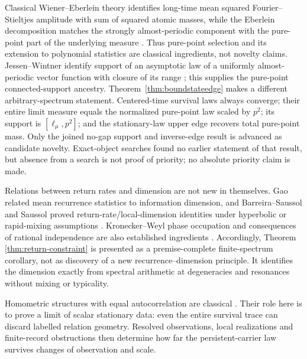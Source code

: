 Classical Wiener--Eberlein theory identifies long-time mean squared
Fourier--Stieltjes amplitude with sum of squared atomic masses, while the
Eberlein decomposition matches the strongly almost-periodic component with
the pure-point part of the underlying measure
\cite{Eberlein1955,StrungaruTerauds2016}.  Thus pure-point selection and its
extension to polynomial statistics are classical ingredients, not novelty
claims.  Jessen--Wintner identify support of an asymptotic law of
a uniformly almost-periodic vector function with closure of its range
\cite{JessenWintner1935}; this supplies the pure-point connected-support
ancestry.  Theorem~\ref{thm:boundstateedge} makes a different
arbitrary-spectrum statement.  Centered-time survival laws always converge;
their entire limit measure equals the normalized pure-point law scaled by
$p^2$; its support is $[\ell_\mu,p^2]$; and the stationary-law upper edge recovers
total pure-point mass.  Only the joined no-gap support and inverse-edge result
is advanced as candidate novelty.  Exact-object searches found no earlier
statement of that result, but absence from a search is not proof of priority;
no absolute priority claim is made.

Relations between return rates and dimension are not new in themselves.
Gao related mean recurrence statistics to information dimension, and
Barreira--Saussol and Saussol proved return-rate/local-dimension identities
under hyperbolic or rapid-mixing assumptions
\cite{Gao1999,BarreiraSaussol2001,Saussol2006}.  Kronecker--Weyl phase
occupation and consequences of rational independence are also established
ingredients \cite{RiddellBertini2024,CamposVenutiOdavicHamma2026}.
Accordingly, Theorem \ref{thm:return-constraint} is presented as a
premise-complete finite-spectrum corollary, not as discovery of a new
recurrence--dimension principle.  It identifies the dimension exactly from
spectral arithmetic at degeneracies and resonances without mixing or
typicality.

Homometric structures with equal autocorrelation are classical
\cite{RosenblattSeymour1982,GrimmBaake2008}.  Their role here is to prove a
limit of scalar stationary data: even the entire survival trace can discard
labelled relation geometry.  Resolved observations, local realizations and
finite-record obstructions then determine how far the persistent-carrier law
survives changes of observation and scale.

